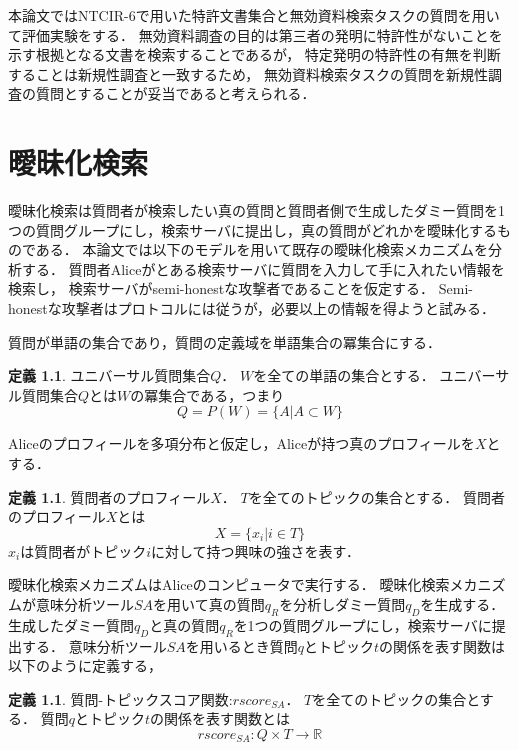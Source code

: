 \documentclass[master]{suribt}
\theoremstyle{definition}
\newtheorem{defi}[thm]{定義}
\begin{document}
 本論文ではNTCIR-6\cite{NTCIR6}で用いた特許文書集合と無効資料検索タスクの質問を用いて評価実験をする．
 無効資料調査の目的は第三者の発明に特許性がないことを示す根拠となる文書を検索することであるが，
 特定発明の特許性の有無を判断することは新規性調査と一致するため，
 無効資料検索タスクの質問を新規性調査の質問とすることが妥当であると考えられる．
 


 \chapter{曖昧化検索} \label{s:OBS}
 曖昧化検索は質問者が検索したい真の質問と質問者側で生成したダミー質問を1つの質問グループにし，検索サーバに提出し，真の質問がどれかを曖昧化するものである．
 本論文では以下のモデル\cite{obs2012}を用いて既存の曖昧化検索メカニズムを分析する．
 質問者Aliceがとある検索サーバに質問を入力して手に入れたい情報を検索し，
 検索サーバがsemi-honestな攻撃者であることを仮定する．
 Semi-honestな攻撃者はプロトコルには従うが，必要以上の情報を得ようと試みる．
 
 質問が単語の集合であり，質問の定義域を単語集合の冪集合にする．
 
 \begin{defi}{ユニバーサル質問集合$Q$．}
  $W$を全ての単語の集合とする．
  ユニバーサル質問集合$Q$とは$W$の冪集合である，つまり
  \begin{equation}
  Q = P(W) = \{A|A \subset W\}
  \end{equation}
 \end{defi}
 Aliceのプロフィールを多項分布と仮定し，Aliceが持つ真のプロフィールを$X$とする．
 
 \begin{defi}{質問者のプロフィール$X$．}
  $T$を全てのトピックの集合とする．
  質問者のプロフィール$X$とは
  \begin{equation}
   X = \{x_i| i \in T\}
  \end{equation}
  $x_i$は質問者がトピック$i$に対して持つ興味の強さを表す．
 \end{defi}
 曖昧化検索メカニズムはAliceのコンピュータで実行する．
 曖昧化検索メカニズムが意味分析ツール$SA$を用いて真の質問$q_R$を分析しダミー質問$q_D$を生成する．
 生成したダミー質問$q_D$と真の質問$q_R$を1つの質問グループにし，検索サーバに提出する．
 意味分析ツール$SA$を用いるとき質問$q$とトピック$t$の関係を表す関数は以下のように定義する，
 
 \begin{defi}{質問-トピックスコア関数:$rscore_{SA}$．}
  $T$を全てのトピックの集合とする．
  質問$q$とトピック$t$の関係を表す関数とは
  \begin{equation}
   rscore_{SA}:Q \times T \to \mathbb{R}
  \end{equation}
 \end{defi}
\end{document}
